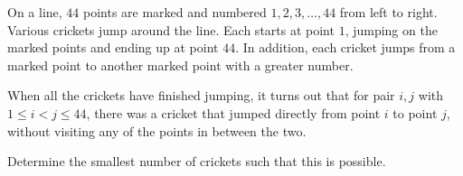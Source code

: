 On a line, $44$ points are marked and numbered $1, 2, 3,…,44$ from left to right. Various crickets jump around the line. Each starts at point $1$,  jumping on the marked points and ending up at point $44$. In addition, each cricket jumps from a marked point to another marked point with a greater number.

When all the crickets have finished jumping, it turns out that for pair $i, j$ with ${1}\leq{i}<{j}\leq{44}$,  there was a cricket that jumped directly from point $i$ to point $j$,  without visiting any of the points in between the two.

Determine the smallest number of crickets such that this is possible.